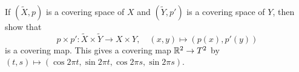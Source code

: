 \begin{exercise}
  If $(\widetilde{X}, p)$ is a covering space of $X$
  and $(\widetilde{Y}, p')$ is a covering space of $Y$,
  then show that
  \[
    p \times p' : \widetilde{X} \times \widetilde{Y} \to X \times Y, \quad
    (x, y) \mapsto (p(x), p'(y))
  \]
  is a covering map. This gives a covering
  map $\mathbb{R}^2 \to T^2$ by
  $(t, s) \mapsto (\cos 2\pi t, \sin 2\pi t, \cos 2\pi s, \sin 2\pi s)$.
\end{exercise}
